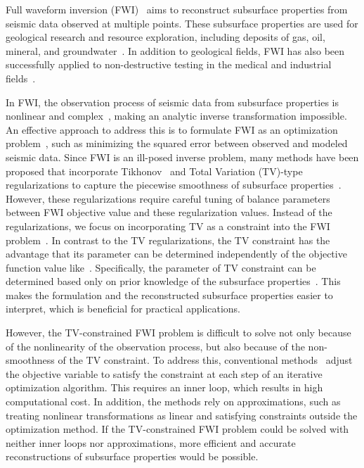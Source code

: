 Full waveform inversion (FWI)~\cite{FWI0,FWI1} aims to reconstruct subsurface properties from seismic data observed at multiple points.
These subsurface properties are used for geological research and resource exploration, including deposits of gas, oil, mineral, and groundwater~\cite{FWI1,FWIApplicationGroundwater0,FWIApplicationGroundwater1}.
In addition to geological fields, FWI has also been successfully applied to non-destructive testing in the medical and industrial fields~\cite{FWIApplicationNonDestructiveTesting0,FWIApplicationNonDestructiveTesting1}.

In FWI, the observation process of seismic data from subsurface properties is nonlinear and complex~\cite{FWI1}, making an analytic inverse transformation impossible.
An effective approach to address this is to formulate FWI as an optimization problem~\cite{FWI0,CustomFWI0,CustomFWI1,CustomFWI2,CustomFWI3,CustomFWI4,CustomFWI5}, such as minimizing the squared error between observed and modeled seismic data.
Since FWI is an ill-posed inverse problem, many methods have been proposed that incorporate Tikhonov~\cite{tikhonov} and Total Variation (TV)-type~\cite{TV,TGV} regularizations to capture the piecewise smoothness of subsurface properties~\cite{FWI-with-tikhonov-regularization,FWI-with-TV-regularization,FWI-with-directional-TV-regularization,FWI-with-high-order-TV-regularization,FWI-with-TGV-regularization}.
However, these regularizations require careful tuning of balance parameters between FWI objective value and these regularization values.
Instead of the regularizations, we focus on incorporating TV as a constraint into the FWI problem~\cite{FWI-with-TV-constraint,FWI-with-TV-constraint2,FWI-with-TV-constraint3,FWI-with-TV-constraint4}.
In contrast to the TV regularizations, the TV constraint has the advantage that its parameter can be determined independently of the objective function value like~\cite{constraint0,constraint1,constraint2,constraint3,constraint4}.
Specifically, the parameter of TV constraint can be determined based only on prior knowledge of the subsurface properties~\cite{constraints-vs-penalties-in-FWI}.
This makes the formulation and the reconstructed subsurface properties easier to interpret, which is beneficial for practical applications.

However, the TV-constrained FWI problem is difficult to solve not only because of the nonlinearity of the observation process, but also because of the non-smoothness of the TV constraint.
To address this, conventional methods~\cite{FWI-with-TV-constraint,FWI-with-TV-constraint2,FWI-with-TV-constraint3,FWI-with-TV-constraint4} adjust the objective variable to satisfy the constraint at each step of an iterative optimization algorithm.
This requires an inner loop, which results in high computational cost.
In addition, the methods rely on approximations, such as treating nonlinear transformations as linear and satisfying constraints outside the optimization method.
If the TV-constrained FWI problem could be solved with neither inner loops nor approximations, more efficient and accurate reconstructions of subsurface properties would be possible.

